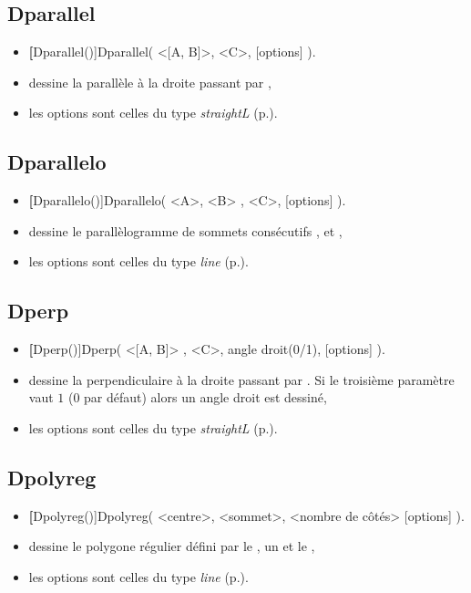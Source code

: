 \subsection{Dparallel}

\begin{itemize}
 \item \util \textbf[Dparallel()]{Dparallel( <[A, B]>, <C>, [options] )}.
 \item \desc dessine la parallèle à la droite \argu{[A,B]} passant par ,
 \item les options sont celles du type \emph{straightL} (p.\pageref{typestraightL}).
\end{itemize} 

\subsection{Dparallelo}

\begin{itemize}
 \item \util \textbf[Dparallelo()]{Dparallelo( <A>, <B> , <C>, [options] )}.
 \item \desc dessine le parallèlogramme de sommets consécutifs ,  et ,
 \item les options sont celles du type \emph{line} (p.\pageref{typeline}).
\end{itemize} 


\subsection{Dperp}

\begin{itemize}
 \item \util \textbf[Dperp()]{Dperp( <[A, B]> , <C>, angle droit(0/1), [options] )}.
 \item \desc dessine la perpendiculaire à la droite \argu{[A,B]} passant par . Si le troisième paramètre vaut $1$ ($0$ par défaut) alors un angle droit est dessiné,
 \item les options sont celles du type \emph{straightL} (p.\pageref{typestraightL}).
\end{itemize}

\subsection{Dpolyreg}

\begin{itemize}
 \item \util \textbf[Dpolyreg()]{Dpolyreg( <centre>, <sommet>, <nombre de côtés> [options] )}.
 \item \desc dessine le polygone régulier défini par le , un  et le ,
 \item les options sont celles du type \emph{line} (p.\pageref{typeline}).
\end{itemize} 

